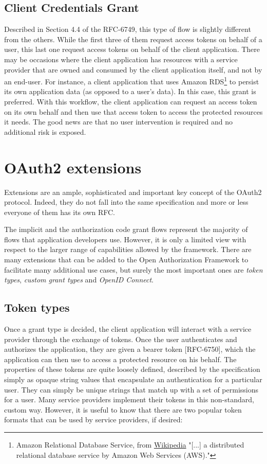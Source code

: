 \subsection{Client Credentials Grant}
Described in Section 4.4 of the RFC-6749, this type of flow is slightly different from the others. While the first three of them request access tokens on behalf of a user, this last one request access tokens on behalf of the client application. There may be occasions where the client application has resources with a service provider that are owned and consumed by the client application itself, and not by an end-user. For instance, a client application that uses Amazon RDS\footnote{Amazon Relational Database Service, from \href{https://en.wikipedia.org/wiki/Amazon_Relational_Database_Service}{Wikipedia} "[...] a distributed relational database service by Amazon Web Services (AWS)."} to persist its own application data (as opposed to a user's data). In this case, this grant is preferred. With this workflow, the client application can request an access token on its own behalf and then use that access token to access the protected resources it needs. The good news are that no user intervention is required and no additional risk is exposed.

\section{OAuth2 extensions}
Extensions are an ample, sophisticated and important key concept of the OAuth2 protocol. Indeed, they do not fall into the same specification and more or less everyone of them has its own RFC.

The implicit and the authorization code grant flows represent the majority of flows that application developers use. However, it is only a limited view with respect to the larger range of capabilities allowed by the framework. There are many extensions that can be added to the Open Authorization Framework to facilitate many additional use cases, but surely the most important ones are \textit{token types}, \textit{custom grant types} and \textit{OpenID Connect}.

\subsection{Token types}
Once a grant type is decided, the client application will interact with a service provider through the exchange of tokens. Once the user authenticates and authorizes the application, they are given a bearer token [RFC-6750], which the application can then use to access a protected resource on his behalf. The properties of these tokens are quite loosely defined, described by the specification simply as opaque string values that encapsulate an authentication for a particular user. They can simply be unique strings that match up with a set of permissions for a user. Many service providers implement their tokens in this non-standard, custom way. However, it is useful to know that there are two popular token formats that can be used by service providers, if desired:

